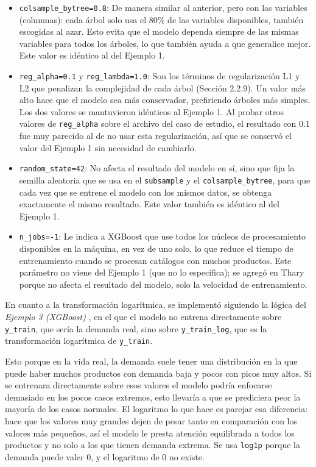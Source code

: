 \begin{itemize}
    \item \texttt{colsample\_bytree=0.8}: De manera similar al anterior, pero con las variables (columnas): cada árbol solo usa el 80\% de las variables disponibles, también escogidas al azar. Esto evita que el modelo dependa siempre de las mismas variables para todos los árboles, lo que también ayuda a que generalice mejor. Este valor es idéntico al del Ejemplo 1.

    \item \texttt{reg\_alpha=0.1} y \texttt{reg\_lambda=1.0}: Son los términos de regularización L1 y L2 que penalizan la complejidad de cada árbol (Sección 2.2.9). Un valor más alto hace que el modelo sea más conservador, prefiriendo árboles más simples. Los dos valores se mantuvieron idénticos al Ejemplo 1. Al probar otros valores de \texttt{reg\_alpha} sobre el archivo del caso de estudio, el resultado con 0.1 fue muy parecido al de no usar esta regularización, así que se conservó el valor del Ejemplo 1 sin necesidad de cambiarlo.

    \item \texttt{random\_state=42}: No afecta el resultado del modelo en sí, sino que fija la semilla aleatoria que se usa en el \texttt{subsample} y el \texttt{colsample\_bytree}, para que cada vez que se entrene el modelo con los mismos datos, se obtenga exactamente el mismo resultado. Este valor también es idéntico al del Ejemplo 1.

    \item \texttt{n\_jobs=-1}: Le indica a XGBoost que use todos los núcleos de procesamiento disponibles en la máquina, en vez de uno solo, lo que reduce el tiempo de entrenamiento cuando se procesan catálogos con muchos productos. Este parámetro no viene del Ejemplo 1 (que no lo específica); se agregó en Thary porque no afecta el resultado del modelo, solo la velocidad de entrenamiento.
\end{itemize}

En cuanto a la transformación logarítmica, se implementó siguiendo la lógica del \textit{Ejemplo 3 (XGBoost)} \cite{ejemplo3_ksmooi_inventorydemand}, en el que el modelo no entrena directamente sobre \texttt{y\_train}, que sería la demanda real, sino sobre \texttt{y\_train\_log}, que es la transformación logarítmica de \texttt{y\_train}.


Esto porque en la vida real, la demanda suele tener una distribución en la que puede haber muchos productos con demanda baja y pocos con picos muy altos. Si se entrenara directamente sobre esos valores el modelo podría enfocarse demasiado en los pocos casos extremos, esto llevaría a que se prediciera peor la mayoría de los casos normales. El logaritmo lo que hace es parejar esa diferencia: hace que los valores muy grandes dejen de pesar tanto en comparación con los valores más pequeños, así el modelo le presta atención equilibrada a todos los productos y no solo a los que tienen demanda extrema. Se usa \texttt{log1p} porque la demanda puede valer 0, y el logaritmo de 0 no existe.



